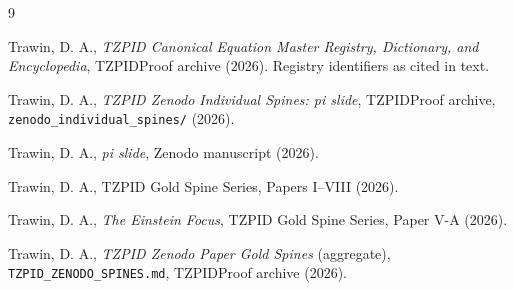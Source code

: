 \documentclass[11pt]{article}
\theoremstyle{remark}
\begin{document}
\begin{thebibliography}{9}

 Trawin, D. A., \emph{TZPID Canonical Equation Master Registry, Dictionary, and Encyclopedia}, TZPIDProof archive (2026). Registry identifiers as cited in text.

 Trawin, D. A., \emph{TZPID Zenodo Individual Spines: pi slide}, TZPIDProof archive, \texttt{zenodo\_individual\_spines/} (2026).

 Trawin, D. A., \emph{pi slide}, Zenodo manuscript (2026).

 Trawin, D. A., TZPID Gold Spine Series, Papers I--VIII (2026).

 Trawin, D. A., \emph{The Einstein Focus}, TZPID Gold Spine Series, Paper V-A (2026).

 Trawin, D. A., \emph{TZPID Zenodo Paper Gold Spines} (aggregate), \texttt{TZPID\_ZENODO\_SPINES.md}, TZPIDProof archive (2026).

\end{thebibliography}
\end{document}
